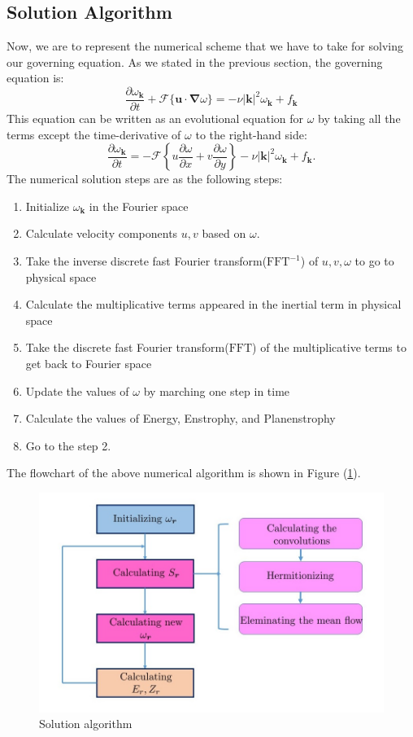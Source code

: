\documentclass[12pt]{article}
\def\grad{\bm{\nabla}}
\def\k{\bm{k}}
\def\u{\bm{u}}
\begin{document}
\subsection{Solution Algorithm}
Now, we are to represent the numerical scheme that we have to take for solving our governing equation. As we stated in the previous section, the governing equation is:
%
\begin{equation}\label{Eq-14}
\frac{\partial\omega_{\k}}{\partial t} + \mathcal{F}\{\u\cdot\grad\omega\}= -\nu{|\k|}^2\omega_{\k} + f_{\k}
\end{equation}
%
This equation can be written as an evolutional equation for $\omega$ by taking all the terms except the time-derivative of $\omega$ to the right-hand side:
%
\begin{equation}\label{Eq-15}
\frac{\partial\omega_{\k}}{\partial t} =- \mathcal{F}\left\lbrace u\dfrac{\partial \omega}{\partial x}+v\dfrac{\partial \omega}{\partial y}\right\rbrace -\nu{|\k|}^2\omega_{\k} + f_{\k}.
\end{equation}
%
The numerical solution steps are as the following steps:
\begin{enumerate}
\item Initialize $\omega_{\k}$ in the Fourier space
\item Calculate velocity components $u,v$ based on $\omega$.
\item Take the inverse discrete fast Fourier transform($\text{FFT}^{-1}$) of $u,v,\omega$ to go to physical space
\item Calculate the multiplicative terms appeared in the inertial term in physical space
\item Take the discrete fast Fourier transform($\text{FFT}$) of the multiplicative terms to get back to Fourier space
\item Update the values of $\omega$ by marching one step in time
\item Calculate the values of Energy, Enstrophy, and Planenstrophy
\item Go to the step 2.
\end{enumerate}
The flowchart of the above numerical algorithm is shown in Figure (\ref{Fig-2}).
%
\begin{figure}[h]
\centering
\includegraphics{algorithm}
\caption{Solution algorithm}\label{Fig-2}
\end{figure}
%
\end{document}
